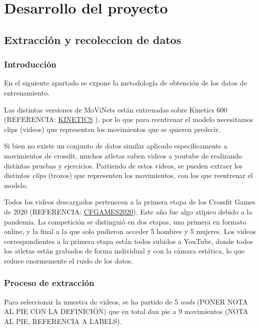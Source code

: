 \chapter{Desarrollo del proyecto}

\section{Extracción y recoleccion de datos}

\subsection{Introducción}

En el siguiente apartado se expone la metodología de obtención de los datos de entrenamiento.

Las distintas versiones de MoViNets están entrenadas sobre Kinetics 600 (REFERENCIA: \href{https://www.deepmind.com/open-source/kinetics}{KINETICS} ), por lo que para reentrenar el modelo necesitamos clips (videos) que representen los movimientos que se quieren predecir.

Si bien no existe un conjunto de datos similar aplicado específicamente a movimientos de crossfit, muchos atletas suben videos a youtube de realizando distintas pruebas y ejercicios. Partiendo de estos videos, se pueden extraer los distintos \textit{clips} (trozos) que representen los movimientos, con los que reentrenar el modelo.

Todos los videos descargados pertenecen a la primera etapa de los Crossfit Games de 2020 (REFERENCIA: \href{https://en.wikipedia.org/wiki/2020_CrossFit_Games}{CFGAMES2020}). Este año fue algo atípico debido a la pandemia. La competición se distinguió en dos etapas, una primera en formato online, y la final a la que solo pudieron acceder 5 hombres y 5 mujeres. Los videos correspondientes a la primera etapa están todos subidos a YouTube, donde todos los atletas están grabados de forma individual y con la cámara estática, lo que reduce enormemente el ruido de los datos.


\subsection{Proceso de extracción}

Para seleccionar la muestra de videos, se ha partido de 5 \textit{wods} (PONER NOTA AL PIE CON LA DEFINICIÓN) que en total dan pie a 9 movimientos (NOTA AL PIE, REFERENCIA A LABELS).


